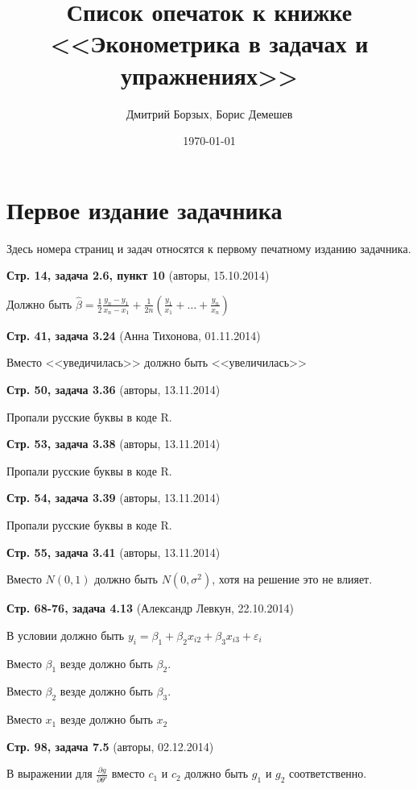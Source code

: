 \documentclass{article}
\date{\today}
\title{Список опечаток к книжке \\
<<Эконометрика в задачах и упражнениях>>}
\author{Дмитрий Борзых, Борис Демешев}
\newcommand{\erroronpage}[4]{\textbf{Стр. #1, #2} (#3, #4)}
\begin{document}
\maketitle

\section{Первое издание задачника}

Здесь номера страниц и задач относятся к первому печатному изданию задачника.




\erroronpage{14}{задача 2.6, пункт 10}{авторы}{15.10.2014}

Должно быть $\hat{\beta} = \frac{1}{2} \frac{y_n - y_1}{x_n - x_1} + \frac{1}{2n}  \left( \frac{y_1}{x_1} + \ldots + \frac{y_n}{x_n} \right) $

\erroronpage{41}{задача 3.24}{Анна Тихонова}{01.11.2014}

Вместо <<уведичилась>> должно быть <<увеличилась>>

\erroronpage{50}{задача 3.36}{авторы}{13.11.2014}

Пропали русские буквы в коде R.

\erroronpage{53}{задача 3.38}{авторы}{13.11.2014}

Пропали русские буквы в коде R.

\erroronpage{54}{задача 3.39}{авторы}{13.11.2014}

Пропали русские буквы в коде R.

\erroronpage{55}{задача 3.41}{авторы}{13.11.2014}

Вместо $N(0, 1)$ должно быть $N(0, \sigma^2)$, хотя на решение это не влияет.

\erroronpage{68-76}{задача 4.13}{Александр Левкун}{22.10.2014}

В условии должно быть $y_i=\beta_1+\beta_2 x_{i2} + \beta_3 x_{i3}+\varepsilon_i$

Вместо $\beta_1$ везде должно быть $\beta_2$.

Вместо $\beta_2$ везде должно быть $\beta_3$.

Вместо $x_1$ везде должно быть $x_2$

\erroronpage{98}{задача 7.5}{авторы}{02.12.2014}

В выражении для $\frac{\partial g}{\partial \theta'}$ вместо $c_1$ и $c_2$ должно быть $g_1$ и $g_2$ соответственно.
\end{document}
